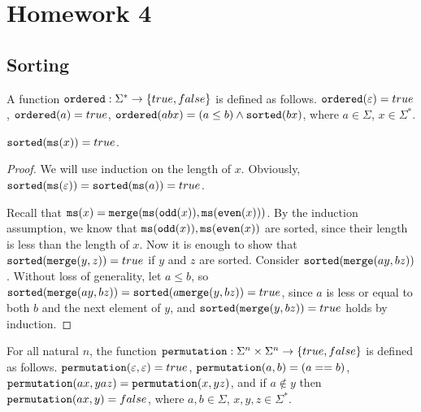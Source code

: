 \section{Homework 4}

\subsection{Sorting}

\begin{definition}[{\tt ordered}]
    A function ${\tt ordered} : \Sigma^* \to \{true, false\}$ is defined as follows. ${\tt ordered}(\varepsilon) = true$, ${\tt ordered}(a) = true$, ${\tt ordered}(a b x) = (a \leq b) \wedge {\tt sorted}(b x)$, where $a \in \Sigma$, $x \in \Sigma^*$.
\end{definition}

\begin{lemma}
    ${\tt sorted}({\tt ms}(x)) = true$.
\end{lemma}
\begin{proof}
    We will use induction on the length of $x$. Obviously, ${\tt sorted}({\tt ms}(\varepsilon)) = {\tt sorted}({\tt ms}(a)) = true$.

    Recall that ${\tt ms}(x) = {\tt merge}({\tt ms}({\tt odd}(x)), {\tt ms}({\tt even}(x)))$. By the induction assumption, we know that ${\tt ms}({\tt odd}(x)), {\tt ms}({\tt even}(x))$ are sorted, since their length is less than the length of $x$. Now it is enough to show that ${\tt sorted}({\tt merge}(y, z)) = true$ if $y$ and $z$ are sorted. Consider ${\tt sorted}({\tt merge}(ay, bz))$. Without loss of generality, let $a \leq b$, so ${\tt sorted}({\tt merge}(ay, bz)) = {\tt sorted}(a {\tt merge}(y, bz)) = true$, since $a$ is less or equal to both $b$ and the next element of $y$, and ${\tt sorted}({\tt merge}(y, bz)) = true$ holds by induction.
\end{proof}

\begin{definition}[{\tt permutation}]
    For all natural $n$, the function ${\tt permutation} : \Sigma^n \times \Sigma^n \to \{true, false\}$ is defined as follows. ${\tt permutation}(\varepsilon, \varepsilon) = true$, ${\tt permutation}(a, b) = (a == b)$, ${\tt permutation}(ax, yaz) = {\tt permutation}(x, yz)$, and if $a \notin y$ then ${\tt permutation}(ax, y) = false$, where $a, b \in \Sigma$, $x, y, z \in \Sigma^*$.
\end{definition}

